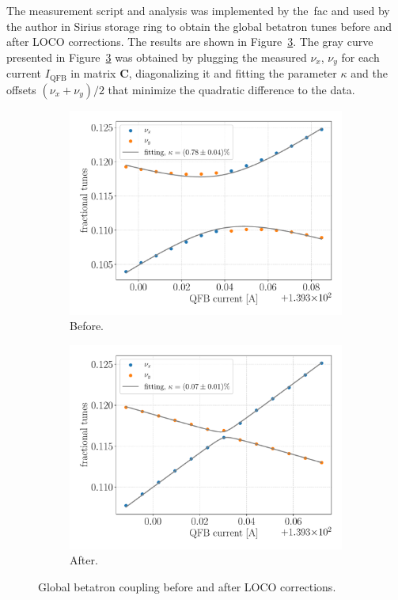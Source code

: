 The measurement script and analysis was implemented by the~\gls{fac} and used by the author in Sirius storage ring to obtain the global betatron tunes before and after LOCO corrections. The results are shown in Figure~\ref{fig:global_coupling}. The gray curve presented in Figure~\ref{fig:global_coupling} was obtained by plugging the measured $\nu_x$, $\nu_y$ for each current $I_{\mathrm{QFB}}$ in matrix $\mathbf{C}$, diagonalizing it and fitting the parameter $\kappa$ and the offsets $(\nu_x+\nu_y)/2$ that minimize the quadratic difference to the data.
\begin{figure}
\centering
\begin{subfigure}[t]{0.49\textwidth}
\includegraphics[width=1.0\textwidth]{figures/coupling_before_loco_grid_filter.pdf}
    \caption{Before.}
    \label{subfig:coup_before}
\end{subfigure}
 \begin{subfigure}[t]{0.49\textwidth}
\includegraphics[width=1.0\textwidth]{figures/coupling_after_loco_grid_filter.pdf}
    \caption{After.}
    \label{subfig:coup_after}
\end{subfigure}
\caption{Global betatron coupling before and after LOCO corrections.}
\label{fig:global_coupling}
\end{figure}

